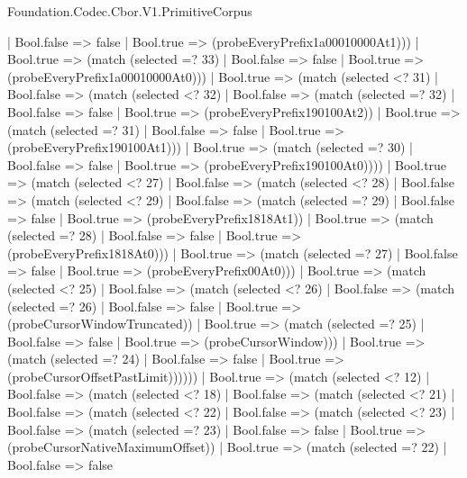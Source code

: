 \begin{lexlean}{Foundation.Codec.Cbor.V1.PrimitiveCorpus}
\begin{semanticmodule}
{                    | Bool.false => false
                    | Bool.true => (probeEveryPrefix1a00010000At1)))
                | Bool.true => (match (selected =? 33)
                  | Bool.false => false
                  | Bool.true => (probeEveryPrefix1a00010000At0)))
              | Bool.true => (match (selected <? 31)
                | Bool.false => (match (selected <? 32)
                  | Bool.false => (match (selected =? 32)
                    | Bool.false => false
                    | Bool.true => (probeEveryPrefix190100At2))
                  | Bool.true => (match (selected =? 31)
                    | Bool.false => false
                    | Bool.true => (probeEveryPrefix190100At1)))
                | Bool.true => (match (selected =? 30)
                  | Bool.false => false
                  | Bool.true => (probeEveryPrefix190100At0))))
            | Bool.true => (match (selected <? 27)
              | Bool.false => (match (selected <? 28)
                | Bool.false => (match (selected <? 29)
                  | Bool.false => (match (selected =? 29)
                    | Bool.false => false
                    | Bool.true => (probeEveryPrefix1818At1))
                  | Bool.true => (match (selected =? 28)
                    | Bool.false => false
                    | Bool.true => (probeEveryPrefix1818At0)))
                | Bool.true => (match (selected =? 27)
                  | Bool.false => false
                  | Bool.true => (probeEveryPrefix00At0)))
              | Bool.true => (match (selected <? 25)
                | Bool.false => (match (selected <? 26)
                  | Bool.false => (match (selected =? 26)
                    | Bool.false => false
                    | Bool.true => (probeCursorWindowTruncated))
                  | Bool.true => (match (selected =? 25)
                    | Bool.false => false
                    | Bool.true => (probeCursorWindow)))
                | Bool.true => (match (selected =? 24)
                  | Bool.false => false
                  | Bool.true => (probeCursorOffsetPastLimit))))))
        | Bool.true => (match (selected <? 12)
          | Bool.false => (match (selected <? 18)
            | Bool.false => (match (selected <? 21)
              | Bool.false => (match (selected <? 22)
                | Bool.false => (match (selected <? 23)
                  | Bool.false => (match (selected =? 23)
                    | Bool.false => false
                    | Bool.true => (probeCursorNativeMaximumOffset))
                  | Bool.true => (match (selected =? 22)
                    | Bool.false => false
}
\end{semanticmodule}
\end{lexlean}
